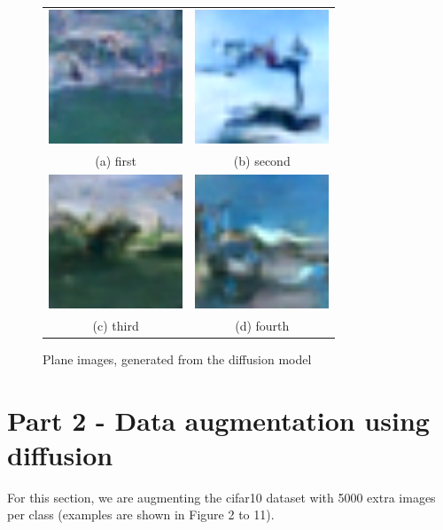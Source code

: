 \documentclass[conference]{IEEEtran}
\begin{document}
\begin{figure}
  \begin{tabular}{cc}
    \includegraphics[width=40mm]{./images/generated-imgs/plane/0000.png} 
&   \includegraphics[width=40mm]{./images/generated-imgs/plane/0001.png} 
\\
  (a) first 
  & (b) second \\[6pt]
      \includegraphics[width=40mm]{./images/generated-imgs/plane/0002.png} 
  &  \includegraphics[width=40mm]{./images/generated-imgs/plane/0003.png} 
\\
  (c) third & (d) fourth \\[6pt]
  \end{tabular}
  \caption{Plane images, generated from the diffusion model}
\end{figure}


\section{Part 2 - Data augmentation using diffusion}
For this section, we are augmenting the cifar10 dataset with 5000 extra images per class (examples are shown in Figure 2 to 11).
\end{document}
